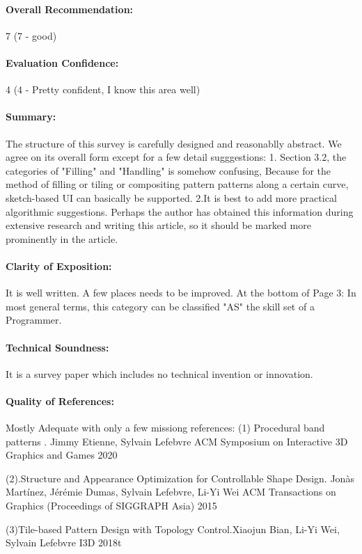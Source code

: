 \documentclass{egpubl}
\begin{document}
\paragraph*{Overall Recommendation:} 7 (7 - good)
\paragraph*{Evaluation Confidence:} 4 (4 - Pretty confident, I know this area well)
\paragraph*{Summary:} The structure of this survey is carefully designed and reasonablly abstract. We agree on its overall form except for a few detail sugggestions:
1. Section 3.2, the categories of "Filling" and "Handling" is somehow confusing, Because for the method of filling or tiling or compositing pattern patterns along a certain curve, sketch-based UI can basically be supported.
2.It is best to add more practical algorithmic suggestions. Perhaps the author has obtained this information during extensive research and writing this article, so it should be marked more prominently in the article.
\paragraph*{Clarity of Exposition:} It is well written.  A few places needs to be improved.
At the bottom of Page 3:  In most general terms, this category can be classified  "AS" the skill set of a Programmer.
\paragraph*{Technical Soundness:} It is a survey paper which includes no technical invention or innovation.
\paragraph*{Quality of References:} Mostly Adequate with only a few missiong references:
(1)
Procedural band patterns . Jimmy Etienne, Sylvain Lefebvre
ACM Symposium on Interactive 3D Graphics and Games 2020

(2).Structure and Appearance Optimization for Controllable Shape Design.
Jonàs Martínez, Jérémie Dumas, Sylvain Lefebvre, Li-Yi Wei
ACM Transactions on Graphics (Proceedings of SIGGRAPH Asia) 2015

(3)Tile-based Pattern Design with Topology Control.Xiaojun Bian, Li-Yi Wei, Sylvain Lefebvre
I3D 2018t
\end{document}

